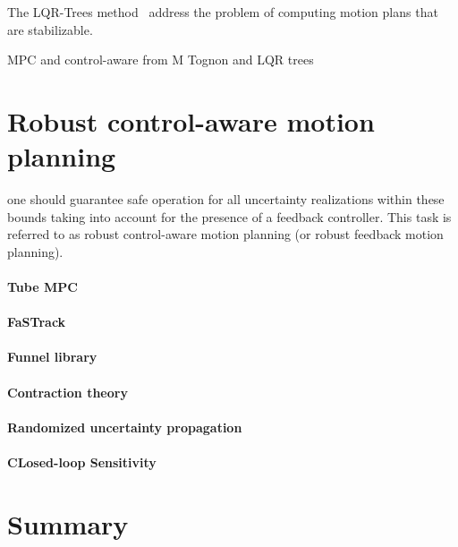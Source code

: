The LQR-Trees method~\cite{cLQRTrees} address the problem of computing motion plans that are stabilizable.

MPC and control-aware from M Tognon and LQR trees

\section{Robust control-aware motion planning}

one should guarantee safe operation for all uncertainty realizations within these bounds taking into account for the presence of a feedback controller. This task is referred to as robust control-aware motion planning (or robust feedback motion planning).

\paragraph{Tube MPC}

\paragraph{FaSTrack}

\paragraph{Funnel library}

\paragraph{Contraction theory}

\paragraph{Randomized uncertainty propagation}

\paragraph{CLosed-loop Sensitivity}

\section{Summary}